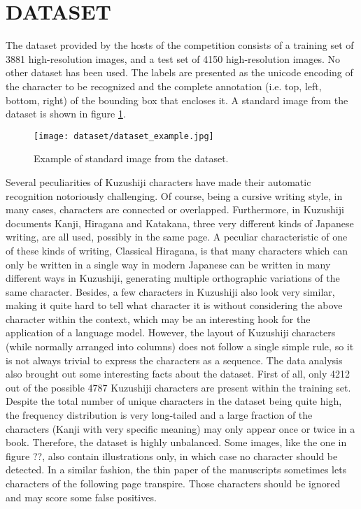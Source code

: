 \section{DATASET}
\label{sec:dataset}

The dataset provided by the hosts of the competition consists of a training set of 3881 high-resolution images, and a test set of 4150 high-resolution images. No other dataset  has been used. The labels are presented as the unicode encoding of the character to be recognized and the complete annotation (i.e. top, left, bottom, right) of the bounding box that encloses it. A standard image from the dataset is shown in figure \ref{fig:dataset_example}.

\begin{figure}[h]
	\caption{Example of standard image from the dataset.}
	\centering
	\texttt{[image: dataset/dataset\_example.jpg]}
	\label{fig:dataset_example}
\end{figure}
Several peculiarities of Kuzushiji characters have made their automatic recognition notoriously challenging. Of course, being a cursive writing style, in many cases, characters are connected or overlapped. Furthermore, in Kuzushiji documents Kanji, Hiragana and Katakana, three very different kinds of Japanese writing, are all used, possibly in the same page. A peculiar characteristic of one of these kinds of writing, Classical Hiragana, is that many characters which can only be written in a single way in modern Japanese can be written in many different ways in Kuzushiji, generating multiple orthographic variations of the same character. Besides, a few characters in Kuzushiji also look very similar, making it quite hard to tell what character it is without considering the above character within the context, which may be an interesting hook for the application of a language model. However, the layout of Kuzushiji characters (while normally arranged into columns) does not follow a single simple rule, so it is not always trivial to express the characters as a sequence. The data analysis also brought out some interesting facts about the dataset. First of all, only 4212 out of the possible 4787 Kuzushiji characters are present within the training set. Despite the total number of unique characters in the dataset being quite high, the frequency distribution is very long-tailed and a large fraction of the characters (Kanji with very specific meaning) may only appear once or twice in a book. Therefore, the dataset is highly unbalanced. Some images, like the one in figure ??, also contain illustrations only, in which case no character should be detected. In a similar fashion, the thin paper of the manuscripts sometimes lets characters of the following page transpire. Those characters should be ignored and may score some false positives.
